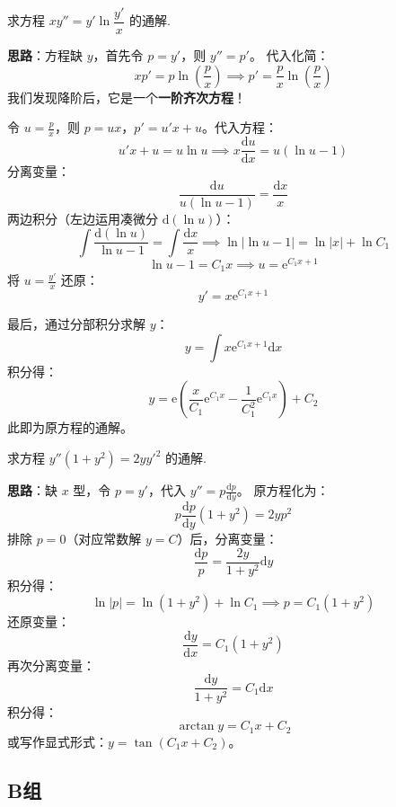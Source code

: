 \documentclass[lang=cn,11pt]{elegantbook}
\begin{document}
\begin{exercise}[可降阶的一阶齐次型综合应用]
求方程 $xy'' = y' \ln \dfrac{y'}{x}$ 的通解.
\end{exercise}
\begin{solution}
\textbf{思路}：方程缺 $y$，首先令 $p=y'$，则 $y''=p'$。
代入化简：
\[
xp' = p \ln\left(\frac{p}{x}\right) \implies p' = \frac{p}{x} \ln\left(\frac{p}{x}\right)
\]
我们发现降阶后，它是一个\textbf{一阶齐次方程}！

令 $u = \frac{p}{x}$，则 $p = ux$，$p' = u'x + u$。代入方程：
\[
u'x + u = u\ln u \implies x\frac{\mathrm{d}u}{\mathrm{d}x} = u(\ln u - 1)
\]
分离变量：
\[
\frac{\mathrm{d}u}{u(\ln u - 1)} = \frac{\mathrm{d}x}{x}
\]
两边积分（左边运用凑微分 $\mathrm{d}(\ln u)$）：
\[
\int \frac{\mathrm{d}(\ln u)}{\ln u - 1} = \int \frac{\mathrm{d}x}{x} \implies \ln|\ln u - 1| = \ln|x| + \ln C_1
\]
\[
\ln u - 1 = C_1 x \implies u = \mathrm{e}^{C_1 x + 1}
\]
将 $u = \frac{y'}{x}$ 还原：
\[
y' = x \mathrm{e}^{C_1 x + 1}
\]

最后，通过分部积分求解 $y$：
\[
y = \int x \mathrm{e}^{C_1 x + 1} \mathrm{d}x
\]
积分得：
\[
\boxed{y = \mathrm{e} \left( \frac{x}{C_1}\mathrm{e}^{C_1 x} - \frac{1}{C_1^2}\mathrm{e}^{C_1 x} \right) + C_2}
\]
此即为原方程的通解。
\end{solution}


\begin{exercise}[缺 $x$ 型二阶方程求解]
求方程 $y''(1+y^2) = 2y y'^2$ 的通解.
\end{exercise}
\begin{solution}
\textbf{思路}：缺 $x$ 型，令 $p=y'$，代入 $y'' = p\frac{\mathrm{d}p}{\mathrm{d}y}$。
原方程化为：
\[
p\frac{\mathrm{d}p}{\mathrm{d}y}(1+y^2) = 2yp^2
\]
排除 $p=0$（对应常数解 $y=C$）后，分离变量：
\[
\frac{\mathrm{d}p}{p} = \frac{2y}{1+y^2}\mathrm{d}y
\]
积分得：
\[
\ln|p| = \ln(1+y^2) + \ln C_1 \implies p = C_1(1+y^2)
\]
还原变量：
\[
\frac{\mathrm{d}y}{\mathrm{d}x} = C_1(1+y^2)
\]
再次分离变量：
\[
\frac{\mathrm{d}y}{1+y^2} = C_1 \mathrm{d}x
\]
积分得：
\[
\boxed{\arctan y = C_1 x + C_2}
\]
或写作显式形式：$y = \tan(C_1 x + C_2)$。
\end{solution}



\subsection{B组}
\end{document}

